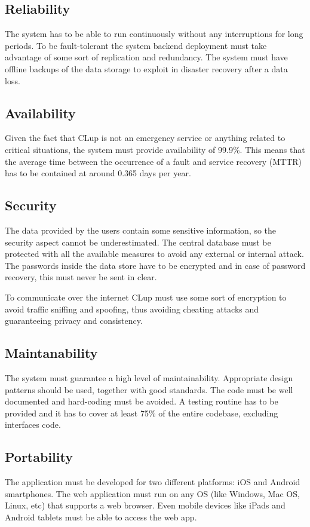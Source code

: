 \subsection{Reliability}
The system has to be able to run continuously without any interruptions for long periods. To be fault-tolerant the system backend deployment must take advantage of some sort of replication and redundancy. The system must have offline backups of the data storage to exploit in disaster recovery after a data loss.

\subsection{Availability}
Given the fact that CLup is not an emergency service or anything related to critical situations, the system must provide availability of 99.9\%. This means that the average time between the occurrence of a fault and service recovery (MTTR) has to be contained at around 0.365 days per year. 

\subsection{Security}
The data provided by the users contain some sensitive information, so the security aspect cannot be underestimated. The central database must be protected with all the available measures to avoid any external or internal attack. The passwords inside the data store have to be encrypted and in case of password recovery, this must never be sent in clear.

To communicate over the internet CLup must use some sort of encryption to avoid traffic sniffing and spoofing, thus avoiding cheating attacks and guaranteeing privacy and consistency.

\subsection{Maintanability}
The system must guarantee a high level of maintainability. Appropriate design patterns should be used, together with good standards. The code must be well documented and hard-coding must be avoided. A testing routine has to be provided and it has to cover at least 75\% of the entire codebase, excluding interfaces code.

\subsection{Portability}
The application must be developed for two different platforms: iOS and Android smartphones. The web application must run on any OS (like Windows, Mac OS, Linux, etc) that supports a web browser. Even mobile devices like iPads and Android tablets must be able to access the web app.